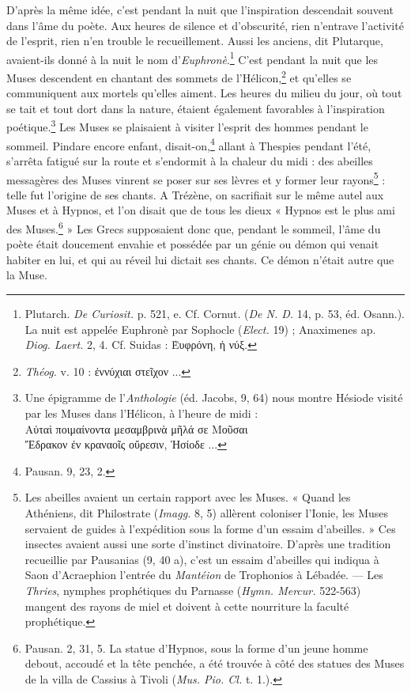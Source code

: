 \documentclass[landscape, a4paper, 11pt, oneside, polutonikogreek, french]{article}
\begin{document}
D'après la même idée, c'est pendant la nuit que l'inspiration descendait souvent dans l'âme du poète. Aux heures de silence et d'obscurité, rien n'entrave l'activité de l'esprit, rien n'en trouble le recueillement. Aussi les anciens, dit Plutarque, avaient-ils donné à la nuit le nom d'\emph{Euphronè}.\footnote{Plutarch. \emph{De Curiosit.} p. 521, e. Cf. Cornut. (\emph{De N. D.} 14, p. 53, éd. Osann.). La nuit est appelée Euphronè par Sophocle (\emph{Elect.} 19) ; Anaximenes ap. \emph{Diog. Laert.} 2, 4. Cf. Suidas : Ὲυφρόνη, ἡ νύξ.} C'est pendant la nuit que les Muses descendent en chantant des sommets de l'Hélicon,\footnote{\emph{Théog.} v. 10 : ἐννύχιαι στεῖχον ...} et qu'elles se communiquent aux mortels qu'elles aiment. Les heures du milieu du jour, où tout se tait et tout dort dans la nature, étaient également favorables à l'inspiration poétique.\footnote{Une épigramme de l'\emph{Anthologie} (éd. Jacobs, 9, 64) nous montre Hésiode visité par les Muses dans l'Hélicon, à l'heure de midi :\\\hspace*{5mm}Αὐταὶ ποιμαίνοντα μεσαμβρινὰ μῆλά σε Μοῦσαι\\\hspace*{5mm}Ἔδρακον ἐν κραναοῖς οὔρεσιν, Ἡσίοδε ...} Les Muses se plaisaient à visiter l'esprit des hommes pendant le sommeil. Pindare encore enfant, disait-on,\footnote{Pausan. 9, 23, 2.} allant à Thespies pendant l'été, s'arrêta fatigué sur la route et s'endormit à la chaleur du midi : des abeilles messagères des Muses vinrent se poser sur ses lèvres et y former leur rayons\footnote{Les abeilles avaient un certain rapport avec les Muses. « Quand les Athéniens, dit Philostrate (\emph{Imagg.} 8, 5) allèrent coloniser l'Ionie, les Muses servaient de guides à l'expédition sous la forme d'un essaim d'abeilles. » Ces insectes avaient aussi une sorte d'instinct divinatoire. D'après une tradition recueillie par Pausanias (9, 40 a), c'est un essaim d'abeilles qui indiqua à Saon d'Acraephion l'entrée du \emph{Mantéion} de Trophonios à Lébadée. --- Les \emph{Thries}, nymphes prophétiques du Parnasse (\emph{Hymn. Mercur.} 522-563) mangent des rayons de miel et doivent à cette nourriture la faculté prophétique.} : telle fut l'origine de ses chants. A Trézène, on sacrifiait sur le même autel aux Muses et à Hypnos, et l'on disait que de tous les dieux « Hypnos est le plus ami des Muses.\footnote{Pausan. 2, 31, 5. La statue d'Hypnos, sous la forme d'un jeune homme debout, accoudé et la tête penchée, a été trouvée à côté des statues des Muses de la villa de Cassius à Tivoli (\emph{Mus. Pio. Cl.} t. 1.).} » Les Grecs supposaient donc que, pendant le sommeil, l'âme du poète était doucement envahie et possédée par un génie ou démon qui venait habiter en lui, et qui au réveil lui dictait ses chants. Ce démon n'était autre que la Muse.
\end{document}

